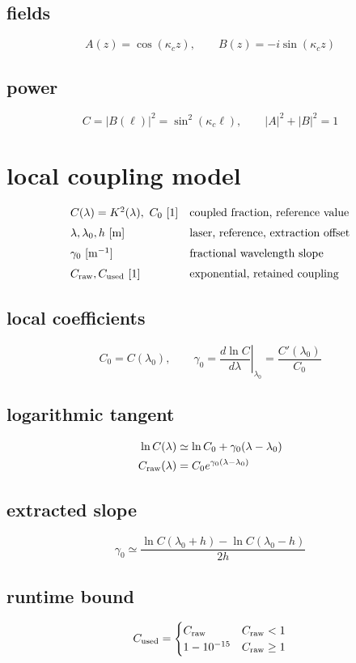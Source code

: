 \documentclass[11pt]{article}
\begin{document}
\subsection*{fields}
\[
\displaystyle A(z)=\cos(\kappa_c z),\qquad B(z)=-i\sin(\kappa_c z)
\]
\subsection*{power}
\[
\displaystyle C=|B(\ell)|^2=\sin^2(\kappa_c\ell),\qquad|A|^2+|B|^2=1
\]

\clearpage
\section*{local coupling model}
\[
\begin{array}{ll}C(\lambda)=K^2(\lambda),\ C_0\ [1]&\text{coupled fraction, reference value}\\[0.6em]\lambda,\lambda_0,h\ [\mathrm m]&\text{laser, reference, extraction offset}\\[0.6em]\gamma_0\ [\mathrm{m^{-1}}]&\text{fractional wavelength slope}\\[0.6em]C_{\rm raw},C_{\rm used}\ [1]&\text{exponential, retained coupling}\end{array}
\]
\subsection*{local coefficients}
\[
\displaystyle C_0=C(\lambda_0),\qquad\gamma_0=\left.\frac{d\ln C}{d\lambda}\right|_{\lambda_0}=\frac{C'(\lambda_0)}{C_0}
\]
\subsection*{logarithmic tangent}
\[
\displaystyle \begin{aligned}\ln C(\lambda)&\simeq\ln C_0+\gamma_0(\lambda-\lambda_0)\\C_{\rm raw}(\lambda)&=C_0e^{\gamma_0(\lambda-\lambda_0)}\end{aligned}
\]
\subsection*{extracted slope}
\[
\displaystyle \gamma_0\simeq\frac{\ln C(\lambda_0+h)-\ln C(\lambda_0-h)}{2h}
\]
\subsection*{runtime bound}
\[
\displaystyle C_{\rm used}=\begin{cases}C_{\rm raw}&C_{\rm raw}<1\\1-10^{-15}&C_{\rm raw}\ge1\end{cases}
\]
\end{document}
